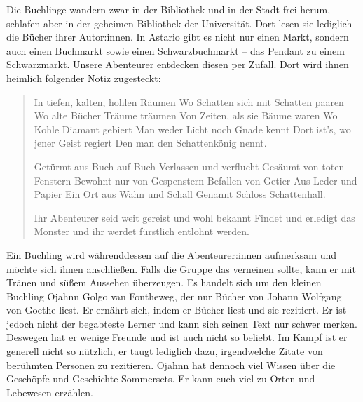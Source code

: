 \documentclass[11pt, twoside]{article}
\begin{document}
Die Buchlinge wandern zwar in der Bibliothek und in der Stadt frei herum, schlafen aber in der geheimen Bibliothek der Universität. Dort lesen sie lediglich die Bücher ihrer Autor:innen. In Astario gibt es nicht nur einen Markt, sondern auch einen Buchmarkt sowie einen Schwarzbuchmarkt – das Pendant zu einem Schwarzmarkt. Unsere Abenteurer entdecken diesen per Zufall. Dort wird ihnen heimlich folgender Notiz zugesteckt:
\begin{quote}
In tiefen, kalten, hohlen Räumen
Wo Schatten sich mit Schatten paaren
Wo alte Bücher Träume träumen
Von Zeiten, als sie Bäume waren
Wo Kohle Diamant gebiert
Man weder Licht noch Gnade kennt
Dort ist’s, wo jener Geist regiert
Den man den Schattenkönig nennt.

Getürmt aus Buch auf Buch
Verlassen und verflucht
Gesäumt von toten Fenstern
Bewohnt nur von Gespenstern
Befallen von Getier
Aus Leder und Papier
Ein Ort aus Wahn und Schall
Genannt Schloss Schattenhall.

Ihr Abenteurer seid weit gereist und wohl bekannt Findet und erledigt das Monster und ihr werdet fürstlich entlohnt werden.
\end{quote}

Ein Buchling wird währenddessen auf die Abenteurer:innen aufmerksam und möchte sich ihnen anschließen. Falls die Gruppe das verneinen sollte, kann er mit Tränen und süßem Aussehen überzeugen. Es handelt sich um den kleinen Buchling Ojahnn Golgo van Fontheweg, der nur Bücher von Johann Wolfgang von Goethe liest. Er ernährt sich, indem er Bücher liest und sie rezitiert. Er ist jedoch nicht der begabteste Lerner und kann sich seinen Text nur schwer merken. Deswegen hat er wenige Freunde und ist auch nicht so beliebt. Im Kampf ist er generell nicht so nützlich, er taugt lediglich dazu, irgendwelche Zitate von berühmten Personen zu rezitieren. Ojahnn hat dennoch viel Wissen über die Geschöpfe und Geschichte Sommersets. Er kann euch viel zu Orten und Lebewesen erzählen.
\end{document}
